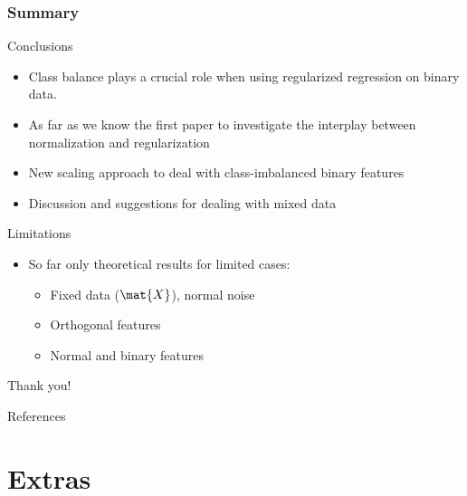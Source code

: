 \documentclass[aspectratio=1610,onlytextwidth]{beamer}
\begin{document}
\begin{frame}[c]
  \frametitle{Summary}
  \begin{exampleblock}{Conclusions}
    \begin{itemize}
      \item Class balance plays a crucial role when using regularized regression on binary data.
      \item As far as we know the first paper to investigate the interplay between normalization and
            regularization
      \item New scaling approach to deal with class-imbalanced binary features
      \item Discussion and suggestions for dealing with mixed data
    \end{itemize}
  \end{exampleblock}

  \pause

  \begin{alertblock}{Limitations}
    \begin{itemize}
      \item So far only theoretical results for limited cases:
            \begin{itemize}
              \item Fixed data (\(\mat{X}\)), normal noise
              \item Orthogonal features
              \item Normal and binary features
            \end{itemize}
    \end{itemize}
  \end{alertblock}
\end{frame}

\begin{frame}[standout]
  Thank you!
\end{frame}

\appendix

\begin{frame}[allowframebreaks]{References}
  \printbibliography[heading=none]
\end{frame}

\section{Extras}
\end{document}
